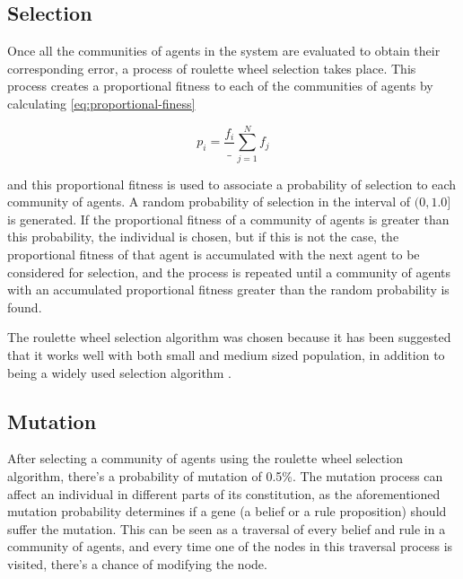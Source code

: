 \subsection{Selection}
\label{subsection:selection}

Once all the communities of agents in the system are evaluated to obtain their
corresponding error, a process of roulette wheel selection takes place. This
process creates a proportional fitness to each of the communities of agents by
calculating \ref{eq:proportional-finess}

\begin{equation}
  \label{eq:proportional-fitness}
  p_i = \frac{f_i}_{\sum_{j=1}^{N} f_j}
\end{equation}

and this proportional fitness is used to associate a probability of selection to
each community of agents. A random probability of selection in the interval of
$(0, 1.0]$ is generated. If the proportional fitness of a community of agents is
greater than this probability, the individual is chosen, but if this is not the
case, the proportional fitness of that agent is accumulated with the next agent
to be considered for selection, and the process is repeated until a community of
agents with an accumulated proportional fitness greater than the random
probability is found.

The roulette wheel selection algorithm was chosen because it has been suggested
that it works well with both small and medium sized population, in addition to
being a widely used selection algorithm \cite{Hancock2012}
\cite{JinghuiZhong2006}. %


\subsection{Mutation}
\label{subsection:mutation}

After selecting a community of agents using the roulette wheel selection
algorithm, there's a probability of mutation of 0.5\%. The mutation process can
affect an individual in different parts of its constitution, as the
aforementioned mutation probability determines if a gene (a belief or a rule
proposition) should suffer the mutation. This can be seen as a traversal of
every belief and rule in a community of agents, and every time one of the nodes
in this traversal process is visited, there's a chance of modifying the node.

